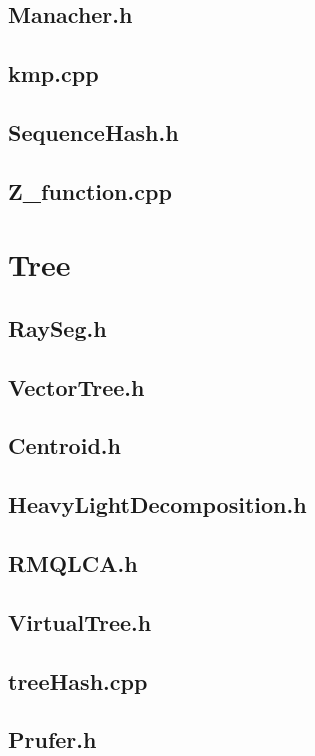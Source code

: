 \subsection{Manacher.h}

\subsection{kmp.cpp}

\subsection{SequenceHash.h}

\subsection{Z\_function.cpp}

\section{Tree}
\subsection{RaySeg.h}

\subsection{VectorTree.h}

\subsection{Centroid.h}

\subsection{HeavyLightDecomposition.h}

\subsection{RMQLCA.h}

\subsection{VirtualTree.h}

\subsection{treeHash.cpp}

\subsection{Prufer.h}

